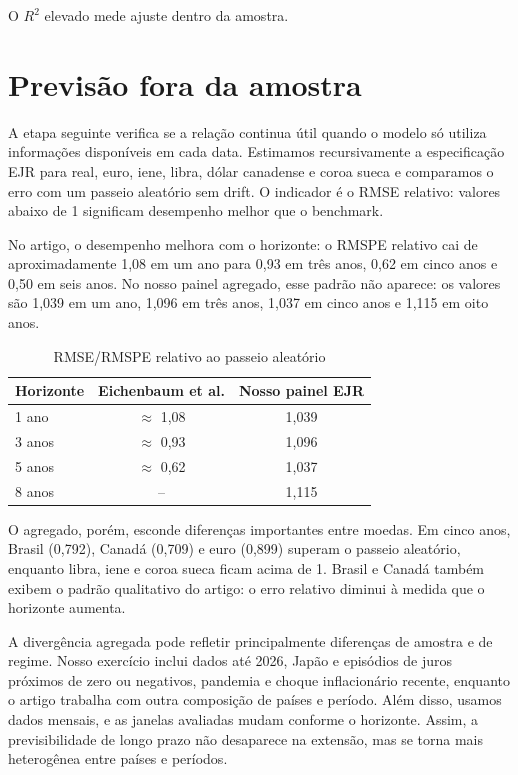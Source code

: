 \documentclass[11pt,a4paper]{article}
\begin{document}
O $R^2$ elevado mede ajuste dentro da amostra.

\section{Previsão fora da amostra}

A etapa seguinte verifica se a relação continua útil quando o modelo só utiliza informações disponíveis em cada data. Estimamos recursivamente a especificação EJR para real, euro, iene, libra, dólar canadense e coroa sueca e comparamos o erro com um passeio aleatório sem drift. O indicador é o RMSE relativo: valores abaixo de 1 significam desempenho melhor que o benchmark.

No artigo, o desempenho melhora com o horizonte: o RMSPE relativo cai de aproximadamente 1,08 em um ano para 0,93 em três anos, 0,62 em cinco anos e 0,50 em seis anos. No nosso painel agregado, esse padrão não aparece: os valores são 1,039 em um ano, 1,096 em três anos, 1,037 em cinco anos e 1,115 em oito anos.

\begin{table}[htbp]
\centering
\caption{RMSE/RMSPE relativo ao passeio aleatório}
\begin{tabular}{lcc}
\toprule
\textbf{Horizonte} & \textbf{Eichenbaum et al.} & \textbf{Nosso painel EJR} \\
\midrule
1 ano  & $\approx$ 1,08 & 1,039 \\
3 anos & $\approx$ 0,93 & 1,096 \\
5 anos & $\approx$ 0,62 & 1,037 \\
8 anos & -- & 1,115 \\
\bottomrule
\end{tabular}
\end{table}

O agregado, porém, esconde diferenças importantes entre moedas. Em cinco anos, Brasil (0,792), Canadá (0,709) e euro (0,899) superam o passeio aleatório, enquanto libra, iene e coroa sueca ficam acima de 1. Brasil e Canadá também exibem o padrão qualitativo do artigo: o erro relativo diminui à medida que o horizonte aumenta.

A divergência agregada pode refletir principalmente diferenças de amostra e de regime. Nosso exercício inclui dados até 2026, Japão e episódios de juros próximos de zero ou negativos, pandemia e choque inflacionário recente, enquanto o artigo trabalha com outra composição de países e período. Além disso, usamos dados mensais, e as janelas avaliadas mudam conforme o horizonte. Assim, a previsibilidade de longo prazo não desaparece na extensão, mas se torna mais heterogênea entre países e períodos.
\end{document}
